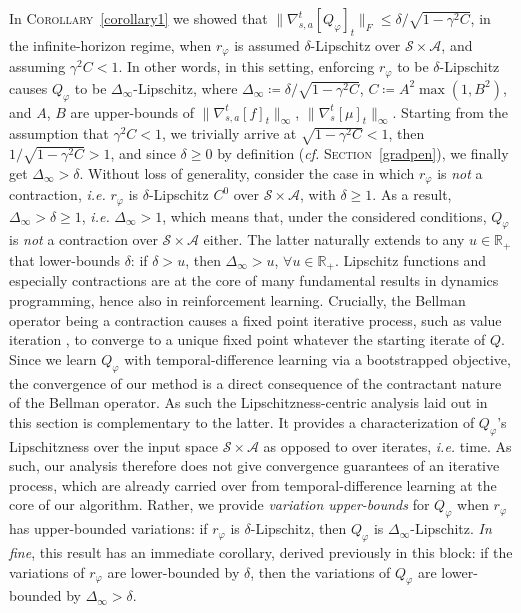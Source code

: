 In \textsc{Corollary}~\ref{corollary1} we showed that
$\lVert \nabla_{s,a}^t[Q_\varphi]_t \rVert _F \leq \delta / \sqrt{1 - \gamma^2 C}$,
in the infinite-horizon regime,
when $r_\varphi$ is assumed $\delta$-Lipschitz over $\mathcal{S} \times \mathcal{A}$,
and assuming $\gamma^2 C < 1$.
In other words, in this setting,
enforcing $r_\varphi$ to be $\delta$-Lipschitz
causes $Q_\varphi$ to be $\Delta_\infty$-Lipschitz,
where $\Delta_\infty \coloneqq \delta / \sqrt{1 - \gamma^2 C}$,
$C \coloneqq A^2 \max(1, B^2)$,
and $A$, $B$ are upper-bounds of
$\lVert\nabla_{s,a}^t[f]_t\rVert _\infty$, $\lVert\nabla_s^t[\mu]_t\rVert _\infty$.
Starting from the assumption that $\gamma^2 C < 1$,
we trivially arrive at $\sqrt{1 - \gamma^2 C} < 1$, then $1 / \sqrt{1 - \gamma^2 C} > 1$,
and since $\delta \geq 0$ by definition (\textit{cf.} \textsc{Section}~\ref{gradpen}),
we finally get $\Delta_\infty > \delta$.
Without loss of generality,
consider the case in which $r_\varphi$ is \emph{not} a contraction, \textit{i.e.} $r_\varphi$
is $\delta$-Lipschitz $C^0$ over $\mathcal{S} \times \mathcal{A}$, with $\delta \geq 1$.
As a result, $\Delta_\infty > \delta \geq 1$, \textit{i.e.} $\Delta_\infty > 1$,
which means that, under the considered conditions,
$Q_\varphi$ is \emph{not} a contraction over $\mathcal{S} \times \mathcal{A}$ either.
The latter naturally extends to any $u \in \mathbb{R}_+$ that lower-bounds $\delta$:
if $\delta > u$, then $\Delta_\infty > u$, $\forall u \in \mathbb{R}_+$.
Lipschitz functions and especially contractions
are at the core of many fundamental
results in dynamics programming, hence also in reinforcement learning.
Crucially, the Bellman operator being a contraction
causes a fixed point iterative process, such as value iteration \cite{Sutton1998-ow},
to converge to a unique fixed point whatever the starting iterate of $Q$.
Since we learn $Q_\varphi$ with temporal-difference learning \cite{Sutton1988-to} via
a bootstrapped objective, the convergence of our method is a direct consequence
of the contractant nature of the Bellman operator.
As such the Lipschitzness-centric analysis laid out in this section is complementary to the latter.
It provides a characterization of $Q_\varphi$'s Lipschitzness
over the input space $\mathcal{S} \times \mathcal{A}$
as opposed to over iterates, \textit{i.e.} time.
As such, our analysis therefore does not give convergence guarantees of an iterative process,
which are already carried over from temporal-difference learning at the core of our algorithm.
Rather, we provide \emph{variation upper-bounds} for $Q_\varphi$
when $r_\varphi$ has upper-bounded variations:
if $r_\varphi$ is $\delta$-Lipschitz,
then $Q_\varphi$ is $\Delta_\infty$-Lipschitz.
\textit{In fine}, this result has an immediate corollary, derived previously in this block:
if the variations of $r_\varphi$ are lower-bounded by $\delta$,
then the variations of $Q_\varphi$ are lower-bounded by $\Delta_\infty>\delta$.

